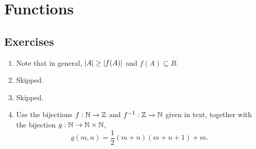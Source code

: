 \section{Functions}
\subsection*{Exercises}
\begin{enumerate}[\thesection-1]
%
\item Note that in general, $\left|A\right| \geq \left|f(A)\right|$ and $f(A) \subseteq B$.
%
\item Skipped.
%
\item Skipped.
%
\item Use the bijections $f : \mathbb{N} \to \mathbb{Z}$ and $f^{-1} : \mathbb{Z} \to \mathbb{N}$ given in text, together with the bijection $g : \mathbb{N} \to \mathbb{N} \times \mathbb{N}$,
\[
g(m, n) = \frac{1}{2}(m + n)(m + n + 1) + m.
\]
%
\end{enumerate}
